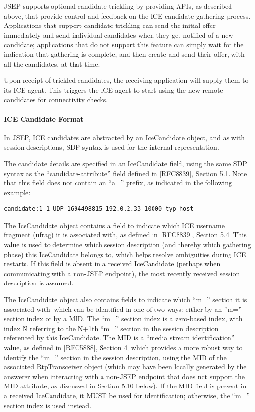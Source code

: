 \documentclass{article}
\begin{document}
JSEP supports optional candidate trickling by providing APIs, as
described above, that provide control and feedback on the ICE
candidate gathering process.  Applications that support candidate
trickling can send the initial offer immediately and send individual
candidates when they get notified of a new candidate; applications
that do not support this feature can simply wait for the indication
that gathering is complete, and then create and send their offer,
with all the candidates, at that time.

Upon receipt of trickled candidates, the receiving application will
supply them to its ICE agent.  This triggers the ICE agent to start
using the new remote candidates for connectivity checks.

\paragraph{ICE Candidate Format}

In JSEP, ICE candidates are abstracted by an IceCandidate object, and
as with session descriptions, SDP syntax is used for the internal
representation.

The candidate details are specified in an IceCandidate field, using
the same SDP syntax as the ``candidate-attribute'' field defined in
[RFC8839], Section 5.1.  Note that this field does not contain an
``a='' prefix, as indicated in the following example:

\begin{verbatim}
candidate:1 1 UDP 1694498815 192.0.2.33 10000 typ host
\end{verbatim}

The IceCandidate object contains a field to indicate which ICE
username fragment (ufrag) it is associated with, as defined in
[RFC8839], Section 5.4.  This value is used to determine which
session description (and thereby which gathering phase) this
IceCandidate belongs to, which helps resolve ambiguities during ICE
restarts.  If this field is absent in a received IceCandidate
(perhaps when communicating with a non-JSEP endpoint), the most
recently received session description is assumed.

The IceCandidate object also contains fields to indicate which ``m=''
section it is associated with, which can be identified in one of two
ways: either by an ``m='' section index or by a MID.  The ``m='' section
index is a zero-based index, with index N referring to the N+1th ``m=''
section in the session description referenced by this IceCandidate.
The MID is a ``media stream identification'' value, as defined in
[RFC5888], Section 4, which provides a more robust way to identify
the ``m='' section in the session description, using the MID of the
associated RtpTransceiver object (which may have been locally
generated by the answerer when interacting with a non-JSEP endpoint
that does not support the MID attribute, as discussed in Section 5.10
below).  If the MID field is present in a received IceCandidate, it
MUST be used for identification; otherwise, the ``m='' section index is
used instead.
\end{document}
